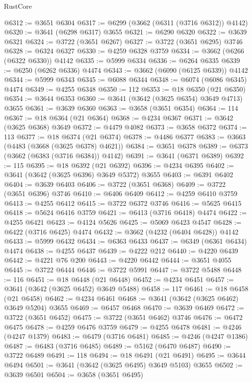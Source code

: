 \begin{lexlean}{RustCore}
\begin{coremodule}
@6312 := @3651 @6304
@6317 := @6299 (@3662 (@6311 (@3716 @6312)) @4142)
@6320 := @3641 (@6298 @6317) @3655
@6321 := @6290 @6320
@6322 := @3639 @6321
@6324 := @3722 (@3651 @6267)
@6327 := @3722 (@3651 @6295) @3746
@6328 := @6324 @6327
@6330 := @4259 @6328 @3759
@6334 := @3662 (@6266 (@6322 @6330)) @4142
@6335 := @5999 @6334
@6336 := @6264 @6335
@6339 := @6250 (@6262 @6336) @4474
@6343 := @3662 (@6090 (@6125 @6339)) @4142
@6344 := @5999 @6343
@6345 := @6088 @6344
@6348 := @6074 (@6086 @6345) @4474
@6349 := @4255 @6348
@6350 := 112
@6353 := @18 @6350 (@21 @6350)
@6354 := @3644 @6353
@6360 := @3641 (@3642 (@3625 @6354) @3649 @4713) @3655
@6361 := @3639 @6360
@6363 := @3658 (@3651 @6354)
@6364 := 114
@6367 := @18 @6364 (@21 @6364)
@6368 := @4234 @6367
@6371 := @3642 (@3625 @6368) @3649
@6372 := @4479 @4082
@6373 := @3658 @6372
@6374 := 113
@6377 := @18 @6374 (@21 @6374)
@6378 := @4486 @6377
@6383 := @3663 (@4483 (@3668 (@3625 @6378) @4621))
@6384 := @3651 @6378
@6389 := @6373 (@3662 (@6383 (@3716 @6384)) @4142)
@6391 := @3641 (@6371 @6389)
@6392 := 115
@6395 := @18 @6392 (@21 @6392)
@6396 := @4234 @6395
@6402 := @3641 (@3642 (@3625 @6396) @3649 @5372) @3655
@6403 := @6391 @6402
@6404 := @3639 @6403
@6406 := @3722 (@3651 @6368)
@6409 := @3722 (@3651 @6396) @3746
@6410 := @6406 @6409
@6412 := @4259 @6410 @3759
@6413 := @4255 @6412
@6415 := @3722 @6372 @3746
@6416 := @5625 @6415
@6418 := @5624 @6416 @3759
@6421 := @6413 (@3716 @6418) @4474
@6422 := @4255 @6421
@6423 := @4124 @5626
@6425 := @5069 @6423 @4547
@6428 := @6422 (@3716 @6425) @4474
@6432 := @3662 (@4232 (@6404 @6428)) @4142
@6433 := @5999 @6432
@6434 := @6363 @6433
@6437 := @6349 (@6361 @6434) @4474
@6438 := @4255 @6437
@6439 := @4222 @212
@6440 := @4220 @6439
@6442 := @4221 @76 @200
@6443 := @4220 @6442
@6444 := @3651 @4055
@6445 := @3722 @6444
@6446 := @3722 @5991
@6447 := @3722 @5488
@6448 := 116
@6451 := @18 @6448 (@21 @6448)
@6452 := @4234 @6451
@6457 := @3641 (@3642 (@3625 @6452) @3649 @5488)
@6458 := 117
@6461 := @18 @6458 (@21 @6458)
@6462 := @4234 @6461
@6468 := @3641 (@3642 (@3625 @6462) @3649 @5204) @3655
@6469 := @6457 @6468
@6470 := @3639 @6469
@6472 := @3722 (@3651 @6452)
@6475 := @3722 (@3651 @6462) @3746
@6476 := @6472 @6475
@6478 := @4259 @6476 @3759
@6479 := @4255 @6478
@6481 := @4246 (@4247 @1379)
@6483 := @6479 (@3716 @6481)
@6485 := @4246 (@4247 @1386)
@6487 := @6483 (@3716 @6485)
@6489 := @5162 (@6470 @6487)
@6490 := @3722 @6489
@6491 := 118
@6494 := @18 @6491 (@21 @6491)
@6495 := @3644 @6494
@6501 := @3641 (@3642 (@3625 @6495) @3649 @5103) @3655
@6502 := @3639 @6501
@6504 := @3658 (@3651 @6495)

\end{coremodule}
\end{lexlean}
